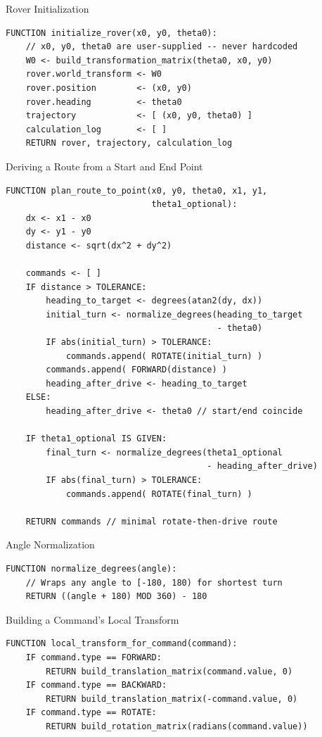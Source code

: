 \documentclass[12pt]{report}
\begin{document}
\begin{pseudobox}{Rover Initialization}
\begin{verbatim}
FUNCTION initialize_rover(x0, y0, theta0):
    // x0, y0, theta0 are user-supplied -- never hardcoded
    W0 <- build_transformation_matrix(theta0, x0, y0)
    rover.world_transform <- W0
    rover.position        <- (x0, y0)
    rover.heading         <- theta0
    trajectory            <- [ (x0, y0, theta0) ]
    calculation_log       <- [ ]
    RETURN rover, trajectory, calculation_log
\end{verbatim}
\end{pseudobox}

\begin{pseudobox}{Deriving a Route from a Start and End Point}
\begin{verbatim}
FUNCTION plan_route_to_point(x0, y0, theta0, x1, y1,
                             theta1_optional):
    dx <- x1 - x0
    dy <- y1 - y0
    distance <- sqrt(dx^2 + dy^2)

    commands <- [ ]
    IF distance > TOLERANCE:
        heading_to_target <- degrees(atan2(dy, dx))
        initial_turn <- normalize_degrees(heading_to_target
                                          - theta0)
        IF abs(initial_turn) > TOLERANCE:
            commands.append( ROTATE(initial_turn) )
        commands.append( FORWARD(distance) )
        heading_after_drive <- heading_to_target
    ELSE:
        heading_after_drive <- theta0 // start/end coincide

    IF theta1_optional IS GIVEN:
        final_turn <- normalize_degrees(theta1_optional
                                        - heading_after_drive)
        IF abs(final_turn) > TOLERANCE:
            commands.append( ROTATE(final_turn) )

    RETURN commands // minimal rotate-then-drive route
\end{verbatim}
\end{pseudobox}

\begin{pseudobox}{Angle Normalization}
\begin{verbatim}
FUNCTION normalize_degrees(angle):
    // Wraps any angle to [-180, 180) for shortest turn
    RETURN ((angle + 180) MOD 360) - 180
\end{verbatim}
\end{pseudobox}

\begin{pseudobox}{Building a Command's Local Transform}
\begin{verbatim}
FUNCTION local_transform_for_command(command):
    IF command.type == FORWARD:
        RETURN build_translation_matrix(command.value, 0)
    IF command.type == BACKWARD:
        RETURN build_translation_matrix(-command.value, 0)
    IF command.type == ROTATE:
        RETURN build_rotation_matrix(radians(command.value))
\end{verbatim}
\end{pseudobox}
\end{document}
